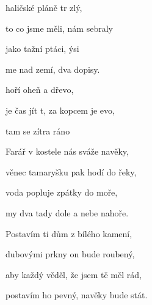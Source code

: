 

\zs
{} haličské pláně tr zlý,

to  co jsme měli, nám  sebraly

jako tažní ptáci, ýsi

me nad zemí, dva  dopisy.
\ks


\zr
{} hoří oheň a  dřevo,

 je čas jít t,   za kopcem je evo,

tam  se zítra ráno 
\kr

\zs
Farář v kostele nás sváže navěky,

věnec tamaryšku pak hodí do řeky,

voda popluje zpátky do moře,

my dva tady dole a nebe nahoře.
\ks

\zr \kr

\zs
Postavím ti dům z bílého kamení,

dubovými prkny on bude roubený,

aby každý věděl, že jsem tě měl rád,

postavím ho pevný, navěky bude stát.
\ks


\zr \kr

\kp





